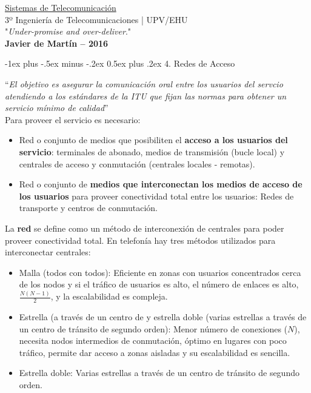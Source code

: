 \documentclass[10pt,portrait, twocolumn]{article}
\makeatletter
\renewcommand{\section}{\@startsection{section}{1}{0mm}%
                                {-1ex plus -.5ex minus -.2ex}%
                                {0.5ex plus .2ex}%
                                {\normalfont\large\bfseries}}
\makeatother
\begin{document}
\begin{framed}
	\begin{center}
    	\Large{\underline{Sistemas de Telecomunicación}} \\
    	\scriptsize{3º Ingeniería de Telecomunicaciones | UPV/EHU}\\
     	"\textsl{Under-promise and over-deliver}." \\
     	\small{\textbf{Javier de Martín -- 2016}}
	\end{center}
\end{framed}


\hrulefill

\section{4. Redes de Acceso}

\hrulefill

``\textit{El objetivo es asegurar la comunicación oral entre los usuarios del servcio atendiendo a los estándares de la ITU que fijan las normas para obtener un servicio mínimo de calidad}''\\

Para proveer el servicio es necesario:

\begin{itemize}
	\item Red o conjunto de medios que posibiliten el \textbf{acceso a los usuarios del servicio}: terminales de abonado, medios de transmisión (bucle local) y centrales de acceso y conmutación (centrales locales - remotas).
	\item Red o conjunto de \textbf{medios que interconectan los medios de acceso de los usuarios} para proveer conectividad total entre los usuarios: Redes de transporte y centros de conmutación.
\end{itemize}

La \textbf{red} se define como un método de interconexión de centrales para poder proveer conectividad total. En telefonía hay tres métodos utilizados para interconectar centrales:

	\begin{itemize}
		\item Malla (todos con todos): Eficiente en zonas con usuarios concentrados cerca de los nodos y si el tráfico de usuarios es alto, el número de enlaces es alto, $\frac{N(N-1)}{2}$, y la escalabilidad es compleja.
		\item Estrella (a través de un centro de y estrella doble (varias estrellas a través de un centro de tránsito de segundo orden): Menor número de conexiones ($N$), necesita nodos intermedios de conmutación, óptimo en lugares con poco tráfico, permite dar acceso a zonas aisladas y su escalabilidad es sencilla.
		\item Estrella doble: Varias estrellas a través de un centro de tránsito de segundo orden.
	\end{itemize}
\end{document}
